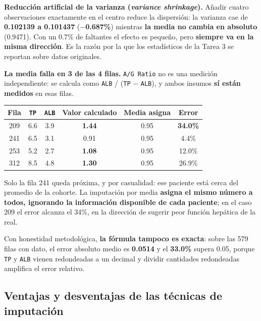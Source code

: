 \documentclass[10pt,a4paper]{article}
\begin{document}
\textbf{Reducción artificial de la varianza (\textit{variance shrinkage}).} Añadir cuatro observaciones exactamente en el centro reduce la dispersión: la varianza cae de \textbf{0.102139 a 0.101437} (\textbf{$-$0.687\%}) mientras \textbf{la media no cambia en absoluto} (0.9471). Con un 0.7\% de faltantes el efecto es pequeño, pero \textbf{siempre va en la misma dirección}. Es la razón por la que los estadísticos de la Tarea 3 se reportan sobre datos originales.

\textbf{La media falla en 3 de las 4 filas.} \texttt{A/G Ratio} no es una medición independiente: se calcula como \texttt{ALB} / (\texttt{TP} $-$ \texttt{ALB}), y ambos insumos \textbf{sí están medidos} en esas filas.

\begin{table}[H]
\footnotesize
\centering
\begin{tabular}{@{}cccccc@{}}
\toprule
\textbf{Fila} & \textbf{\texttt{TP}} & \textbf{\texttt{ALB}} & \textbf{Valor calculado} & \textbf{Media asigna} & \textbf{Error} \\
\midrule
209 & 6.6 & 3.9 & \textbf{1.44} & 0.95 & \textbf{34.0\%} \\
241 & 6.5 & 3.1 & 0.91 & 0.95 & 4.4\% \\
253 & 5.2 & 2.7 & \textbf{1.08} & 0.95 & 12.0\% \\
312 & 8.5 & 4.8 & \textbf{1.30} & 0.95 & 26.9\% \\
\bottomrule
\end{tabular}
\end{table}

Solo la fila 241 queda próxima, y por casualidad: ese paciente está cerca del promedio de la cohorte. La imputación por media \textbf{asigna el mismo número a todos, ignorando la información disponible de cada paciente}; en el caso 209 el error alcanza el 34\%, en la dirección de sugerir peor función hepática de la real.

Con honestidad metodológica, \textbf{la fórmula tampoco es exacta}: sobre las 579 filas con dato, el error absoluto medio es \textbf{0.0514} y el \textbf{33.0\%} supera 0.05, porque \texttt{TP} y \texttt{ALB} vienen redondeadas a un decimal y dividir cantidades redondeadas amplifica el error relativo.

\subsection{Ventajas y desventajas de las técnicas de imputación}
\end{document}
